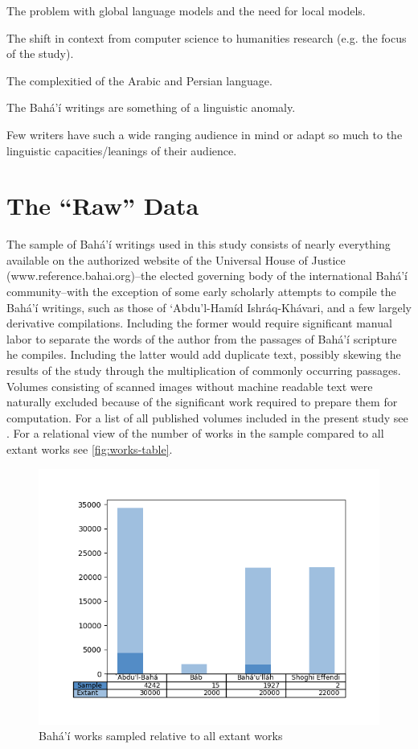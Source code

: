 \documentclass[12pt, oneside]{report}
\begin{document}
The problem with global language models and the need for local models.

The shift in context from computer science to humanities research (e.g. the focus of the study).

The complexitied of the Arabic and Persian language.

The Bah\'{a}'\'{i} writings are something of a linguistic anomaly.

Few writers have such a wide ranging audience in mind or adapt so much to the linguistic capacities/leanings of their audience.
\section{The ``Raw'' Data}
\par
The sample of Bah\'{a}'\'{i}  writings used in this study consists of nearly everything available on the authorized website of the Universal House of Justice (www.reference.bahai.org)–the elected governing body of the international  Bah\'{a}'\'{i} community–with the exception of some early scholarly attempts to compile the Bah\'{a}'\'{i} writings, such as those of `Abdu'l-Ham\'{i}d Ishr\'{a}q-Kh\'{a}vari, and a few largely derivative compilations. Including the former would require significant manual labor to separate the words of the author from the passages of Bah\'{a}'\'{i} scripture he compiles. Including the latter would add duplicate text, possibly skewing the results of the study through the multiplication of commonly occurring passages. Volumes consisting of scanned images without machine readable text were naturally excluded because of the significant work required to prepare them for computation. For a list of all published volumes included in the present study see . For a relational view of the number of works in the sample compared to all extant works see \autoref{fig:works-table}.
\begin{figure}[htb]
\centering
\includegraphics[width=15cm]{figures/works-table.png}
\caption[Bah\'{a}'\'{i} works sampled relative to all extant works]{Bah\'{a}'\'{i} works sampled relative to all extant works}
\label{fig:works-table}
\end{figure}
\end{document}
